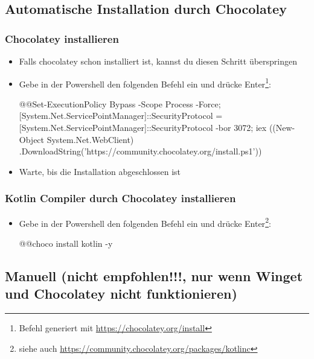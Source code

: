 \subsection*{Automatische Installation durch Chocolatey}
\subsubsection*{Chocolatey installieren}
\begin{itemize}
    \item Falls chocolatey schon installiert ist, kannst du diesen Schritt überspringen
    \item Gebe in der Powershell den folgenden Befehl ein und drücke Enter\footnote{Befehl generiert mit \url{https://chocolatey.org/install}}:
    \begin{commandshell}
        @\shellprefix{}@Set-ExecutionPolicy Bypass -Scope Process -Force; 
        [System.Net.ServicePointManager]::SecurityProtocol = 
        [System.Net.ServicePointManager]::SecurityProtocol -bor 3072; 
        iex ((New-Object System.Net.WebClient)
        .DownloadString('https://community.chocolatey.org/install.ps1'))
    \end{commandshell}
    \item Warte, bis die Installation abgeschlossen ist
\end{itemize}
\subsubsection*{Kotlin Compiler durch Chocolatey installieren}
\begin{itemize}
    \item Gebe in der Powershell den folgenden Befehl ein und drücke Enter\footnote{siehe auch \url{https://community.chocolatey.org/packages/kotlinc}}:
    \begin{commandshell}
        @\shellprefix{}@choco install kotlin -y
    \end{commandshell}
\end{itemize}
\subsection*{Manuell (nicht empfohlen!!!, nur wenn Winget und Chocolatey nicht funktionieren)}
